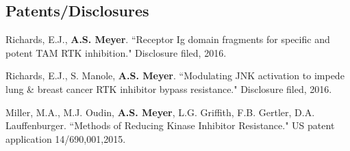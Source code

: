 \documentclass[11pt]{res}
\begin{document}
\begin{resume}
\section{Patents/Disclosures}

Richards, E.J., {\bf A.S. Meyer}. ``Receptor Ig domain fragments for specific and potent TAM RTK inhibition." Disclosure filed, 2016.

Richards, E.J., S. Manole, {\bf A.S. Meyer}. ``Modulating JNK activation to impede lung \& breast cancer RTK inhibitor bypass resistance." Disclosure filed, 2016.

Miller, M.A., M.J. Oudin, {\bf A.S. Meyer}, L.G. Griffith, F.B. Gertler, D.A. Lauffenburger. ``Methods of Reducing Kinase Inhibitor Resistance." US patent application 14/690,001,2015.

\end{resume} 
\end{document}
